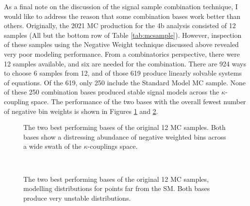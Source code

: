     As a final note on the discussion of the signal sample combination technique,
        I would like to address the reason that some combination bases work better than others.
    Originally, the 2021 MC production for the 4b analysis consisted of 12 samples (All but the bottom row of Table \ref{tab:mcsample}).
    However, inspection of these samples using the Negative Weight technique discussed above revealed very poor modeling performance.
    From a combinatorics perspective, there were 12 samples available, and six are needed for the combination.
    There are 924 ways to choose 6 samples from 12, and of those 619 produce linearly solvable systems of equations.
    Of the 619, only 250 include the Standard Model MC sample.
    None of these 250 combination bases produced stable signal models across the $\kappa$-coupling space.
    The performance of the two bases with the overall fewest number of negative bin weights is shown in Figures \ref{fig:mcnWeight_old} and \ref{fig:mcpreviews_old}.

    \begin{figure}[tbh]
    	\centering
        \caption{
            The two best performing bases of the original 12 MC samples.
            Both bases show a distressing abundance of negative weighted bins across a wide swath of the $\kappa$-couplings space.
        }
        \label{fig:mcnWeight_old}
    \end{figure}


    \begin{figure}[tbh]
    	\centering
        \\
        \caption{
            The two best performing bases of the original 12 MC samples,
                modelling \mhh distributions for points far from the SM.
            Both bases produce very unstable distributions.
        }
        \label{fig:mcpreviews_old}
    \end{figure}


